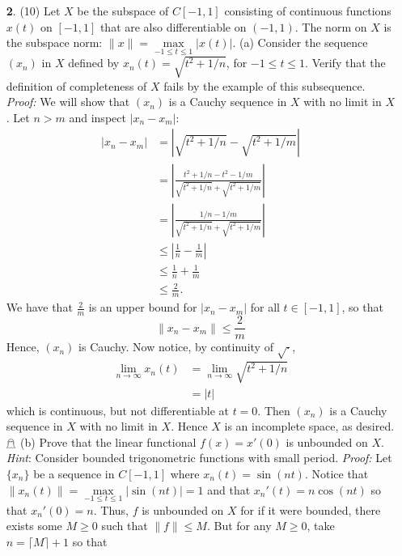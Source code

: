 \documentclass{article}
\begin{document}
\begin{itemize}
    \item[\textbf{2}.] (10) Let $X$ be the subspace of $C[-1,1]$ consisting of continuous functions $x(t)$ on $[-1,1]$ that are also differentiable on $(-1,1)$. The norm on $X$ is the subspace norm: $\|x\| = \underset{-1 \leq t \leq 1}{\max} |x(t)|$.
    \newline
    (a) Consider the sequence $(x_n)$ in $X$ defined by $x_n(t) = \sqrt{t^2 + 1/n}$, for $-1 \leq t \leq 1$. Verify that the definition of completeness of $X$ fails by the example of this subsequence.
    \newline\newline
    \textit{Proof:} We will show that $(x_n)$ is a Cauchy sequence in $X$ with no limit in $X$. Let $n > m$ and inspect $|x_n - x_m|$:
    \begin{align*}
        |x_n - x_m| &= |\sqrt{t^2 + 1/n} - \sqrt{t^2 + 1/m}|\\
        &= \left|\frac{t^2 + 1/n - t^2 - 1/m}{\sqrt{t^2 + 1/n} + \sqrt{t^2 + 1/m}}\right|\\
        &= \left|\frac{1/n - 1/m}{\sqrt{t^2 + 1/n} + \sqrt{t^2 + 1/m}}\right|\\
        &\leq \left|\frac{1}{n} - \frac{1}{m}\right|\\
        &\leq \frac{1}{n} + \frac{1}{m}\\
        &\leq \frac{2}{m}.
    \end{align*}
    We have that $\frac{2}{m}$ is an upper bound for $|x_n - x_m|$ for all $t \in [-1,1]$, so that
    \[\|x_n - x_m\| \leq \frac{2}{m}\]
    Hence, $(x_n)$ is Cauchy. Now notice, by continuity of $\sqrt{\cdot}$,
    \begin{align*}
        \lim_{n \to \infty} x_n(t) &= \lim_{n \to \infty} \sqrt{t^2 + 1/n}\\
        &= |t|
    \end{align*}
    which is continuous, but not differentiable at $t = 0$. Then $(x_n)$ is a Cauchy sequence in $X$ with no limit in $X$. Hence $X$ is an incomplete space, as desired. \hfill $\mathghost$
    \newline\newline
    (b) Prove that the linear functional $f(x) = x'(0)$ is unbounded on $X$.
    \newline
    \textit{Hint}: Consider bounded trigonometric functions with small period.
    \newline\newline
    \textit{Proof:} Let $\{x_n\}$ be a sequence in $C[-1,1]$ where $x_n(t) = \sin(nt)$. Notice that $\|x_n(t)\| = \underset{-1 \leq t \leq 1}{\max} |\sin(nt)| = 1$ and that $x_n'(t) = n\cos(nt)$ so that $x_n'(0) = n$.  Thus, $f$ is unbounded on $X$ for if it were bounded, there exists some $M \geq 0$ such that $\|f\| \leq M$. But for any $M \geq 0$, take $n = \lceil M \rceil + 1$ so that

\end{itemize}
\end{document}
